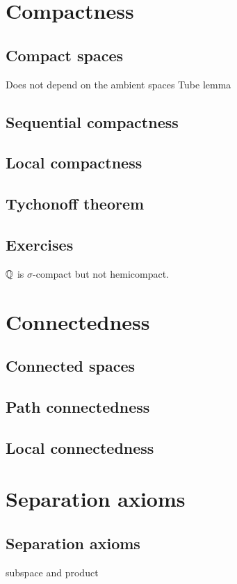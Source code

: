 \documentclass{../../large}
\begin{document}
\chapter{Compactness}
\section{Compact spaces}

Does not depend on the ambient spaces
Tube lemma

\section{Sequential compactness}
\section{Local compactness}
\section{Tychonoff theorem}
\section*{Exercises}
\begin{prb}
$\mathbb{Q}$ is $\sigma$-compact but not hemicompact.
\end{prb}
\chapter{Connectedness}
\section{Connected spaces}
\section{Path connectedness}
\section{Local connectedness}



\chapter{Separation axioms}
\section{Separation axioms}
subspace and product
\end{document}
